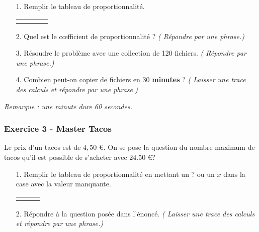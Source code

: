\documentclass[12pt]{article}
\begin{document}
\begin{enumerate}
\item[1.] Remplir le tableau de proportionnalité.
  \begin{center}
    \begin{tabular}{| c || c | c | c |}
      \hline
      \phantom{$\frac{aze}{aazertyuiop}$ \phantom{azertyuiop}} & \phantom{$\frac{aze}{aazertyuiop}$} & \phantom{$\frac{aze}{aazertyuiop}$}  & \phantom{$\frac{aze}{aazertyuiop}$}\\
      \hline
       & & & \\ 
      \hline
    \end{tabular}
  \end{center}
\item[2.] Quel est le cœfficient de proportionnalité ? \textit{( Répondre par une phrase.)}
\vspace{1cm}

\item[3.] Résoudre le problème avec une collection de 120 fichiers. \textit{( Répondre par une phrase.)}
  \vspace{1cm}
\item[4.] Combien peut-on copier de fichiers en 30 \textbf{minutes} ? \textit{( Laisser une trace des calculs et répondre par une phrase.)} 
  \vspace{2cm}
\end{enumerate}
\textit{Remarque : une minute dure 60 secondes.}

\subsubsection*{Exercice 3 - Master Tacos}

Le prix d'un tacos est de $4,50$ \euro{}. On se pose la question du nombre maximum de tacos qu'il est possible de s'acheter avec 24.50 \euro{}?

\begin{enumerate}
\item[1.] Remplir le tableau de proportionnalité en mettant un ? ou un $x$ dans la case avec la valeur manquante.

  \begin{center}
    \begin{tabular}{| c || c | c |}
      \hline
      \phantom{$\frac{aze}{aazertyuiop azertyuiop}$} & \phantom{$\frac{aze}{aazertyuiop}$} & \phantom{$\frac{aze}{aazertyuiop}$} \\
      \hline
      \phantom{$\frac{aze}{aazertyuiop azertyuiop}$} & \phantom{$\frac{aze}{aazertyuiop}$} & \phantom{$\frac{aze}{aazertyuiop}$} \\ 
      \hline
    \end{tabular}
  \end{center}

\item[2.] Répondre à la question posée dans l'énoncé. \textit{( Laisser une trace des calculs et répondre par une phrase.)}
  \vspace{2cm}

\end{enumerate}
\end{document}
